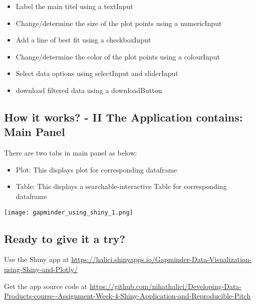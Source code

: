 \documentclass[
]{article}
\providecommand{\tightlist}{%
  \setlength{\itemsep}{0pt}\setlength{\parskip}{0pt}}
\begin{document}
\begin{itemize}
\tightlist
\item
  Label the main titel using a textInput
\item
  Change/determine the size of the plot points using a numericInput
\item
  Add a line of best fit using a checkboxInput
\item
  Change/determine the color of the plot points using a colourInput
\item
  Select data options using selectInput and sliderInput
\item
  download filtered data using a downloadButton
\end{itemize}

\hypertarget{how-it-works---ii-the-application-contains-main-panel}{%
\subsection{How it works? - II \textbar{} The Application contains: Main
Panel}\label{how-it-works---ii-the-application-contains-main-panel}}

There are two tabs in main panel as below:

\begin{itemize}
\tightlist
\item
  Plot: This displays plot for corresponding dataframe
\item
  Table: This displays a searchable-interactive Table for corresponding
  dataframe
\end{itemize}

\texttt{[image: gapminder\_using\_shiny\_1.png]}

\hypertarget{ready-to-give-it-a-try}{%
\subsection{Ready to give it a try?}\label{ready-to-give-it-a-try}}

Use the Shiny app at
\url{https://halici.shinyapps.io/Gapminder-Data-Visualization-using-Shiny-and-Plotly/}

Get the app source code at
\url{https://github.com/nihathalici/Developing-Data-Products-course--Assignment-Week-4-Shiny-Application-and-Reproducible-Pitch}
\end{document}
